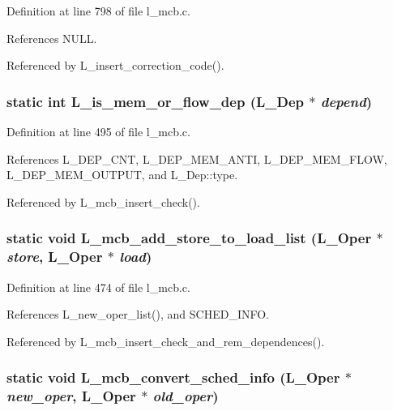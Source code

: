 Definition at line 798 of file l\_\-mcb.c.

References NULL.

Referenced by L\_\-insert\_\-correction\_\-code().
\subsubsection{\setlength{\rightskip}{0pt plus 5cm}static int L\_\-is\_\-mem\_\-or\_\-flow\_\-dep (\bf{L\_\-Dep} $\ast$ {\em depend})\hspace{0.3cm}{\tt  [static]}}\label{l__mcb_8c_0f8879fc8c3ff1ca855016ae4251a8d4}




Definition at line 495 of file l\_\-mcb.c.

References L\_\-DEP\_\-CNT, L\_\-DEP\_\-MEM\_\-ANTI, L\_\-DEP\_\-MEM\_\-FLOW, L\_\-DEP\_\-MEM\_\-OUTPUT, and L\_\-Dep::type.

Referenced by L\_\-mcb\_\-insert\_\-check().
\subsubsection{\setlength{\rightskip}{0pt plus 5cm}static void L\_\-mcb\_\-add\_\-store\_\-to\_\-load\_\-list (L\_\-Oper $\ast$ {\em store}, L\_\-Oper $\ast$ {\em load})\hspace{0.3cm}{\tt  [static]}}\label{l__mcb_8c_1ca14cb238c2d86325a87cdf70d088ec}




Definition at line 474 of file l\_\-mcb.c.

References L\_\-new\_\-oper\_\-list(), and SCHED\_\-INFO.

Referenced by L\_\-mcb\_\-insert\_\-check\_\-and\_\-rem\_\-dependences().
\subsubsection{\setlength{\rightskip}{0pt plus 5cm}static void L\_\-mcb\_\-convert\_\-sched\_\-info (L\_\-Oper $\ast$ {\em new\_\-oper}, L\_\-Oper $\ast$ {\em old\_\-oper})\hspace{0.3cm}{\tt  [static]}}\label{l__mcb_8c_075622f23f1acb22f6a1c3db0a589a8b}




